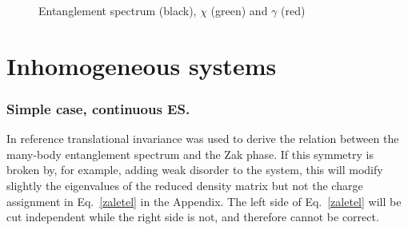 \documentclass[twocolumn,amsmath,longbibliography,amssymb,superscriptaddress]{revtex4-1}
\begin{document}
\begin{figure}[h!]
\centering
{}\hspace{0mm}

\caption{Entanglement spectrum (black), $\chi$ (green) and $\gamma$ (red)  }
\label{2}
\end{figure}




\section{Inhomogeneous systems}

\subsubsection{Simple case, continuous ES.}

In reference \cite{Zaletel2014} translational invariance was used to derive the relation between the many-body entanglement spectrum and the Zak phase. If this symmetry is broken by, for example, adding weak disorder to the system, this will modify slightly the eigenvalues of the reduced density matrix but not the charge assignment in Eq.~\eqref{zaletel} in the Appendix. The left side of Eq.~\eqref{zaletel} will be cut independent while the right side is not, and therefore cannot be correct. 
\end{document}
